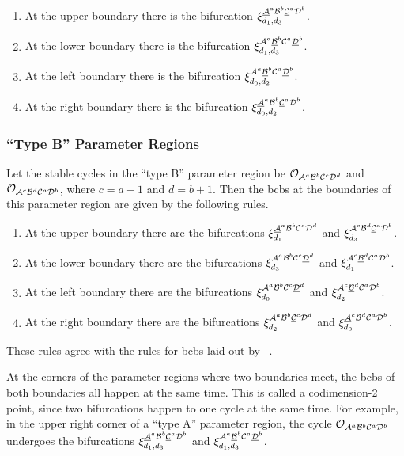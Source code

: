 \begin{enumerate}
	\item At the upper boundary there is the bifurcation $\xi_{d_1, d_3}^{\underline{\mathcal{A}}^a\mathcal{B}^b\underline{\mathcal{C}}^a\mathcal{D}^b}$.
	\item At the lower boundary there is the bifurcation $\xi_{d_1, d_3}^{\mathcal{A}^a\underline{\mathcal{B}}^b\mathcal{C}^a\underline{\mathcal{D}}^b}$.
	\item At the left boundary there is the bifurcation $\xi_{d_0, d_2}^{\mathcal{A}^a\underline{\mathcal{B}}^b\mathcal{C}^a\underline{\mathcal{D}}^b}$.
	\item At the right boundary there is the bifurcation $\xi_{d_0, d_2}^{\underline{\mathcal{A}}^a\mathcal{B}^b\underline{\mathcal{C}}^a\mathcal{D}^b}$.
\end{enumerate}

\subsubsection{``Type B'' Parameter Regions}

Let the stable cycles in the ``type B'' parameter region be $\mathcal{O}_{\mathcal{A}^a\mathcal{B}^b\mathcal{C}^c\mathcal{D}^d}$ and $\mathcal{O}_{\mathcal{A}^c\mathcal{B}^d\mathcal{C}^a\mathcal{D}^b}$, where $c = a - 1$ and $d = b + 1$.
Then the \glspl{bcb} at the boundaries of this parameter region are given by the following rules.

\begin{enumerate}
	\item At the upper boundary there are the bifurcations $\xi_{d_1}^{\underline{\mathcal{A}}^a\mathcal{B}^b\mathcal{C}^c\mathcal{D}^d}$ and $\xi_{d_3}^{\mathcal{A}^c\mathcal{B}^d\underline{\mathcal{C}}^a\mathcal{D}^b}$.
	\item At the lower boundary there are the bifurcations $\xi_{d_3}^{\mathcal{A}^a\mathcal{B}^b\mathcal{C}^c\underline{\mathcal{D}}^d}$ and $\xi_{d_1}^{\mathcal{A}^c\underline{\mathcal{B}}^d\mathcal{C}^a\mathcal{D}^b}$.
	\item At the left boundary there are the bifurcations $\xi_{d_0}^{\mathcal{A}^a\mathcal{B}^b\mathcal{C}^c\underline{\mathcal{D}}^d}$ and $\xi_{d_2}^{\mathcal{A}^c\underline{\mathcal{B}}^d\mathcal{C}^a\mathcal{D}^b}$.
	\item At the right boundary there are the bifurcations $\xi_{d_2}^{\mathcal{A}^a\mathcal{B}^b\underline{\mathcal{C}}^c\mathcal{D}^d}$ and $\xi_{d_0}^{\underline{\mathcal{A}}^c\mathcal{B}^d\mathcal{C}^a\mathcal{D}^b}$.
\end{enumerate}

These rules agree with the rules for \glspl{bcb} laid out by ~\cite{akyuz2022}.

At the corners of the parameter regions where two boundaries meet, the \glspl{bcb} of both boundaries all happen at the same time.
This is called a codimension-2 point, since two bifurcations happen to one cycle at the same time.
For example, in the upper right corner of a ``type A'' parameter region, the cycle $\mathcal{O}_{\mathcal{A}^a\mathcal{B}^b\mathcal{C}^a\mathcal{D}^b}$ undergoes the bifurcations $\xi_{d_1, d_3}^{\underline{\mathcal{A}}^a\mathcal{B}^b\underline{\mathcal{C}}^a\mathcal{D}^b}$ and $\xi_{d_1, d_3}^{\mathcal{A}^a\underline{\mathcal{B}}^b\mathcal{C}^a\underline{\mathcal{D}}^b}$.

